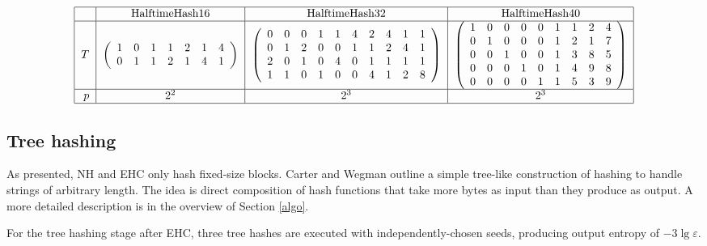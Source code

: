 \documentclass[runningheads]{llncs}
\begin{document}
\[
\begin{tabular}{|r|c|c|c|}
  \hline  & HalftimeHash16 & HalftimeHash32 & HalftimeHash40 \\
  \hline $T$ & 
$\left(
\begin{array}{rrrrrrrrrrrr}
  1 & 0 & 1 & 1 & 2 & 1 & 4\\
  0 & 1 & 1 & 2 & 1 & 4 & 1
\end{array}
\right)$
&
$\left(
\begin{array}{rrrrrrrrrr}
 0 & 0 & 0 & 1 & 1 & 4 & 2 & 4 & 1 & 1 \\
 0 & 1 & 2 & 0 & 0 & 1 & 1 & 2 & 4 & 1 \\
 2 & 0 & 1 & 0 & 4 & 0 & 1 & 1 & 1 & 1 \\
 1 & 1 & 0 & 1 & 0 & 0 & 4 & 1 & 2 & 8
\end{array}
\right)$
&
$\left(
\begin{array}{rrrrrrrrr}
 1 & 0 & 0 & 0 & 0 & 1 & 1 & 2 & 4\\
 0 & 1 & 0 & 0 & 0 & 1 & 2 & 1 & 7\\
 0 & 0 & 1 & 0 & 0 & 1 & 3 & 8 & 5\\
 0 & 0 & 0 & 1 & 0 & 1 & 4 & 9 & 8\\
 0 & 0 & 0 & 0 & 1 & 1 & 5 & 3 & 9
\end{array}
\right)$ \\
\hline $p$ & $2^2$ & $2^3$ & $2^3$ \\
\hline
\end{tabular}
\]


\subsection{Tree hashing}

As presented, NH and EHC only hash fixed-size blocks.
Carter and Wegman outline a simple tree-like construction of hashing to handle strings of arbitrary length. \cite{badger,carter-wegman-79}
The idea is direct composition of hash functions that take more bytes as input than they produce as output.
A more detailed description is in the overview of Section \ref{algo}.

For the tree hashing stage after EHC, three tree hashes are executed with independently-chosen seeds, producing output entropy of $-3 \lg \varepsilon$.

\end{document}
